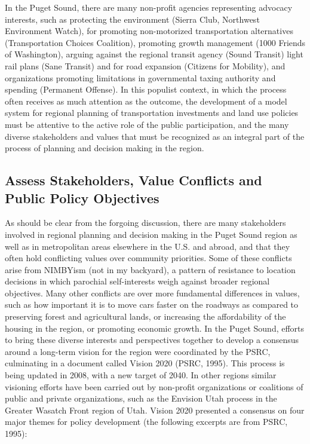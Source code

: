 In the Puget Sound, there are many non-profit agencies representing advocacy interests, such as protecting the environment (Sierra Club, Northwest Environment Watch), for promoting non-motorized transportation alternatives (Transportation Choices Coalition), promoting growth management (1000 Friends of Washington), arguing against the regional transit agency (Sound Transit) light rail plans (Sane Transit) and for road expansion (Citizens for Mobility), and organizations promoting limitations in governmental taxing authority and spending (Permanent Offense).  In this populist context, in which the process often receives as much attention as the outcome, the development of a model system for regional planning of transportation investments and land use policies must be attentive to the active role of the public participation, and the many diverse stakeholders and values that must be recognized as an integral part of the process of planning and decision making in the region.

\subsection{Assess Stakeholders, Value Conflicts and Public Policy Objectives}

As should be clear from the forgoing discussion, there are many stakeholders involved in regional planning and decision making in the Puget Sound region as well as in metropolitan areas elsewhere in the U.S. and abroad, and that they often hold conflicting values over community priorities.  Some of these conflicts arise from NIMBYism (not in my backyard), a pattern of resistance to location decisions in which parochial self-interests weigh against broader regional objectives.  Many other conflicts are over more fundamental differences in values, such as how important it is to move cars faster on the roadways as compared to preserving forest and agricultural lands, or increasing the affordability of the housing in the region, or promoting economic growth.  In the Puget Sound, efforts to bring these diverse interests and perspectives together to develop a consensus around a long-term vision for the region were coordinated by the PSRC, culminating in a document called Vision 2020 (PSRC, 1995).  This process is being updated in 2008, with a new target of 2040.  In other regions similar visioning efforts have been carried out by non-profit organizations or coalitions of public and private organizations, such as the Envision Utah process in the Greater Wasatch Front region of Utah.  Vision 2020 presented a consensus on four major themes for policy development (the following excerpts are from PSRC, 1995):

